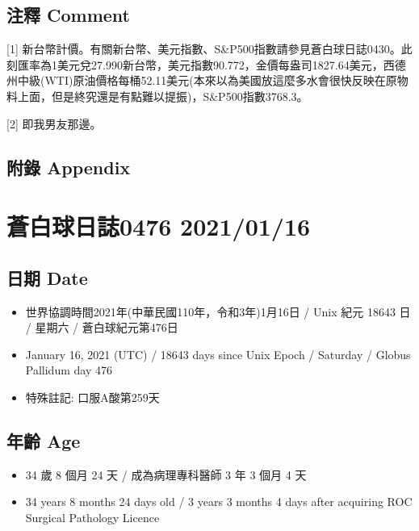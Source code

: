 \documentclass[a5paper, 10pt
]{book}
\providecommand{\tightlist}{%
  \setlength{\itemsep}{0pt}\setlength{\parskip}{0pt}}
\begin{document}
\hypertarget{ux6ce8ux91cb-comment-45}{%
\subsection{注釋 Comment}\label{ux6ce8ux91cb-comment-45}}

{[}1{]}
新台幣計價。有關新台幣、美元指數、S\&P500指數請參見蒼白球日誌0430。此刻匯率為1美元兌27.990新台幣，美元指數90.772，金價每盎司1827.64美元，西德州中級(WTI)原油價格每桶52.11美元(本來以為美國放這麼多水會很快反映在原物料上面，但是終究還是有點難以提振)，S\&P500指數3768.3。

{[}2{]} 即我男友那邊。

\hypertarget{ux9644ux9304-appendix-45}{%
\subsection{附錄 Appendix}\label{ux9644ux9304-appendix-45}}

\hypertarget{ux84bcux767dux7403ux65e5ux8a8c0476-20210116}{%
\section{蒼白球日誌0476
2021/01/16}\label{ux84bcux767dux7403ux65e5ux8a8c0476-20210116}}

\hypertarget{ux65e5ux671f-date-46}{%
\subsection{日期 Date}\label{ux65e5ux671f-date-46}}

\begin{itemize}
\tightlist
\item
  世界協調時間2021年(中華民國110年，令和3年)1月16日 / Unix 紀元 18643 日
  / 星期六 / 蒼白球紀元第476日
\item
  January 16, 2021 (UTC) / 18643 days since Unix Epoch / Saturday /
  Globus Pallidum day 476
\item
  特殊註記: 口服A酸第259天
\end{itemize}

\hypertarget{ux5e74ux9f61-age-46}{%
\subsection{年齡 Age}\label{ux5e74ux9f61-age-46}}

\begin{itemize}
\tightlist
\item
  34 歲 8 個月 24 天 / 成為病理專科醫師 3 年 3 個月 4 天
\item
  34 years 8 months 24 days old / 3 years 3 months 4 days after
  acquiring ROC Surgical Pathology Licence
\end{itemize}
\end{document}
